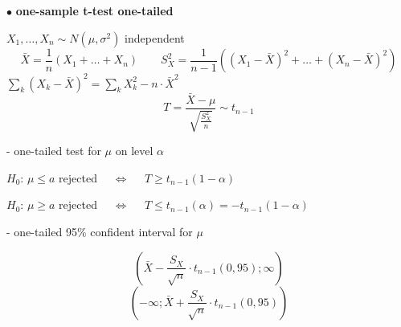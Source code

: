 \documentclass[twoside]{book}
\begin{document}
\pagestyle{empty}

\def\dr #1{\par\noindent $\bullet$ {\bf #1}}





\dr{one-sample t-test one-tailed}
\vspace*{2mm}
\par $X_{1},\dots,X_{n}\sim N(\mu,\sigma^2)$ independent
$$\bar{X}=\frac1{n}\left(X_1 + \dots + X_{n}\right) \qquad S_{X}^2=\frac1{n-1}\left((X_1-\bar{X})^2 + \dots + (X_{n}-\bar{X})^2\right)$$
$\sum_{k}(X_{k}-\bar{X})^2=   \sum_{k}X_{k}^2- n\cdot \bar{X}^2    $
$$ \qquad T=\frac{\bar{X}-\mu}{\sqrt{\frac{S_{X}^2}{n}}}\sim t_{n-1}\qquad     $$
\par\noindent - one-tailed test for $\mu$ on level $\alpha$
\vspace*{3mm}
\par $H_0$:  $\mu\leq a$ rejected $\quad\Longleftrightarrow\quad$  $T \geq t_{n-1}(1-\alpha)$
\vspace*{2mm}
\par $H_0$:  $\mu\geq a$ rejected $\quad\Longleftrightarrow\quad$  $T \leq t_{n-1}(\alpha) = - t_{n-1}(1-\alpha)$
\vspace*{5mm}
\par\noindent - one-tailed 95\% confident interval for $\mu$


$$\left(\bar{X}-\frac{S_{X}}{\sqrt{n}}\cdot t_{n-1}(0,95);\infty \right)$$
$$\left(-\infty ;\bar{X}+\frac{S_{X}}{\sqrt{n}}\cdot t_{n-1}(0,95) \right)$$
\end{document}
